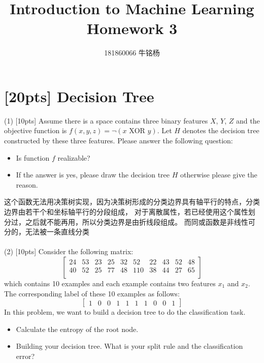 \documentclass{article}
\title{Introduction to Machine Learning\\Homework 3}
\author{181860066 牛铭杨}
\begin{document}
	\maketitle
	
	\section{[20pts] Decision Tree}

	(1) [10pts] Assume there is a space contains three binary features $X$, $Y$, $Z$ and the objective function is $f(x,y,z)=\neg(x \text{ XOR } y)$. Let $H$ denotes the decision tree constructed by these three features. Please answer the following question:
	\begin{itemize}
		\item Is function $f$ realizable? 
		\item If the answer is yes, please draw the decision tree $H$ otherwise please give the reason.\\
    \end{itemize}
    这个函数无法用决策树实现，因为决策树形成的分类边界具有轴平行的特点，分类边界由若干个和坐标轴平行的分段组成，
    对于离散属性，若已经使用这个属性划分过，之后就不能再用，所以分类边界是由折线段组成。
    而同或函数是非线性可分的，无法被一条直线分类\\\\
	(2) [10pts] Consider the following matrix:
	$$
	\left[
	\begin{matrix}
	24 & 53 & 23 & 25 & 32 & 52 & 22 & 43 & 52 & 48 \\
	40 & 52 & 25 & 77 & 48 & 110 & 38 & 44 & 27 & 65\\
	\end{matrix}
	\right]
	$$
	which contains 10 examples and each example contains two features $x_1$ and $x_2$. The corresponding label of these 10 examples as follows:
	$$
	\left[
	\begin{matrix}
	1 & 0 & 0 &1 & 1 & 1 & 1& 0 & 0 & 1
	\end{matrix}
	\right]
	$$
	In this problem, we want to build a decision tree to do the classification task.
	\begin{itemize}
		\item Calculate the entropy of the root node.
		\item Building your decision tree. What is your split rule  and the classification error?\\
	\end{itemize}
\end{document}
